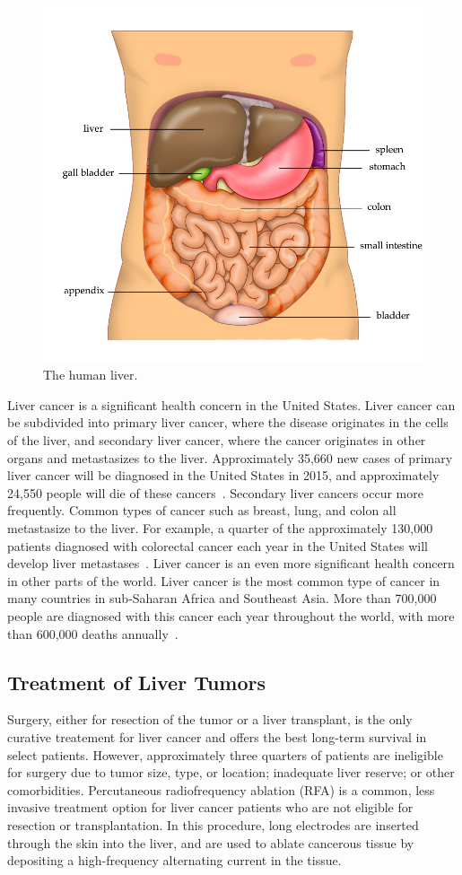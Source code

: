 \begin{figure}[!ht]
\centering
\includegraphics[width = 0.75\columnwidth]{./Images/Chapter1/liverIllustration.jpg}%
\caption{The human liver.}
\label{fig:Ch1LiverAnatomy}
\end{figure}    

Liver cancer is a significant health concern in the United States. Liver cancer can be subdivided into primary liver cancer, where the disease originates in the cells of the liver, and secondary liver cancer, where the cancer originates in other organs and metastasizes to the liver. Approximately 35,660 new cases of primary liver cancer will be diagnosed in the United States in 2015, and approximately 24,550 people will die of these cancers~\cite{AmericanCancer2015}. Secondary liver cancers occur more frequently. Common types of cancer such as breast, lung, and colon all metastasize to the liver. For example, a quarter of the approximately 130,000 patients diagnosed with colorectal cancer each year in the United States will develop liver metastases~\cite{Ananthakrishnan2006,CDC2015,Haddad2011}. Liver cancer is an even more significant health concern in other parts of the world. Liver cancer is the most common type of cancer in many countries in sub-Saharan Africa and Southeast Asia. More than 700,000 people are diagnosed with this cancer each year throughout the world, with more than 600,000 deaths annually~\cite{AmericanCancer2015}.

\subsection{Treatment of Liver Tumors}
Surgery, either for resection of the tumor or a liver transplant, is the only curative treatement for liver cancer and offers the best long-term survival in select patients. However, approximately three quarters of patients are ineligible for surgery due to tumor size, type, or location; inadequate liver reserve; or other comorbidities. Percutaneous radiofrequency ablation (RFA) is a common, less invasive treatment option for liver cancer patients who are not eligible for resection or transplantation. In this procedure, long electrodes are inserted through the skin into the liver, and are used to ablate cancerous tissue by depositing a high-frequency alternating current in the tissue. 

